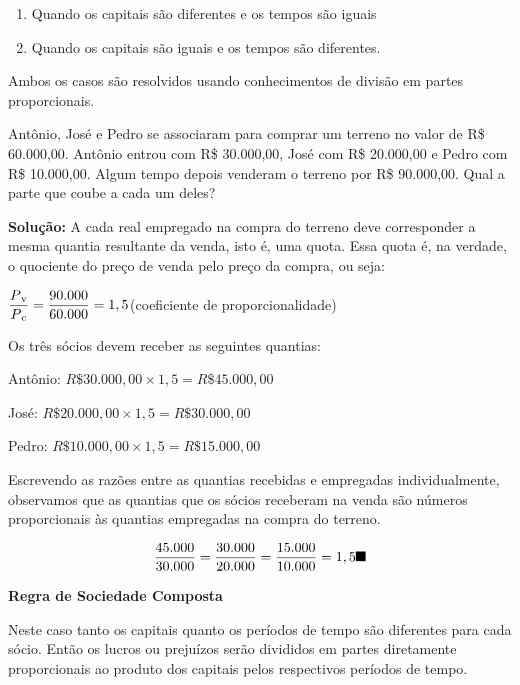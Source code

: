 \begin{enumerate}[label=\arabic*)]
	\item Quando os capitais são diferentes e os tempos são iguais

	\item Quando os capitais são iguais e os tempos são diferentes. 
\end{enumerate}

Ambos os casos são resolvidos usando conhecimentos de divisão em partes proporcionais. 

\begin{texemplo}
	Antônio, José e Pedro se associaram para comprar um terreno no valor de R\$  60.000,00. Antônio entrou com R\$  30.000,00, José com R\$  20.000,00 e Pedro com R\$ 10.000,00. Algum tempo depois venderam o terreno por R\$ 90.000,00. Qual a parte que coube a cada um deles?


\textbf{Solução: }A cada real empregado na compra do terreno deve corresponder a mesma quantia resultante da venda, isto é, uma quota. Essa quota é, na verdade, o quociente do preço de venda pelo preço da compra, ou seja:

$\dfrac{P\text{\textsubscript{v}}}{P\text{\textsubscript{c}}}=\dfrac{90.000}{60.000}=1,5$\quad  (coeficiente de proporcionalidade)

Os três sócios devem receber as seguintes quantias:

	Antônio: $R\$30.000,00 \times 1,5 = R\$45.000,00$ 

	José: $R\$20.000,00 \times 1,5 = R\$30.000,00$

	Pedro: $R\$10.000,00 \times 1,5 = R\$15.000,00$

Escrevendo as razões entre as quantias recebidas e empregadas individualmente, observamos que as quantias que os sócios receberam na venda são números proporcionais às quantias empregadas na compra do terreno.

$$\dfrac{45.000}{30.000}=\dfrac{30.000}{20.000}=\dfrac{15.000}{10.000}=1,5 \textrm{\qedsymbol{}}$$
\end{texemplo}

\quad \textbf{Regra de Sociedade Composta}

\quad Neste caso tanto os capitais quanto os períodos de tempo são diferentes para cada sócio. Então os lucros ou prejuízos serão divididos em partes diretamente proporcionais ao produto dos capitais pelos respectivos períodos de tempo.

